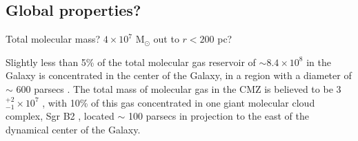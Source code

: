 \subsection{Global properties?}

Total molecular mass?  $4\times10^7$ M$_\odot$ out to $r<200$ pc?

 Slightly less than 5\% of the total molecular gas reservoir of $\sim8.4\times10^8$ \msun in the Galaxy is concentrated in the center of the Galaxy, in a region with a diameter of $\sim$ 600 parsecs \citep{Dahmen98, Nakanishi06}. The total mass of molecular gas in the CMZ is believed to be 3$^{+2}_{-1}\times10^7$ \msun \citep{Dahmen98}, with 10\% of this gas concentrated in one giant molecular cloud complex, Sgr B2 \citep{Gordon93}, located $\sim$ 100 parsecs in projection to the east of the dynamical center of the Galaxy.
